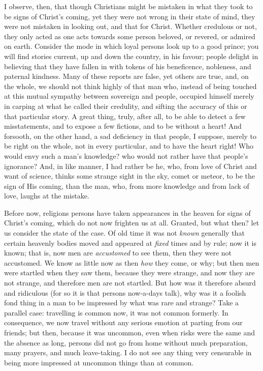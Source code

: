 I observe, then, that though Christians might be mistaken in what
they took to be signs of Christ's coming, yet they were not wrong in
their state of mind, they were not mistaken in looking out, and that
for Christ. Whether credulous or not, they only acted as one acts
towards some person beloved, or revered, or admired on earth. Consider
the mode in which loyal persons look up to a good prince; you will
find stories current, up and down the country, in his favour; people
delight in believing that they have fallen in with tokens of his
beneficence, nobleness, and paternal kindness. Many of these reports
are false, yet others are true, and, on the whole, we should not think
highly of that man who, instead of being touched at this mutual
sympathy between sovereign and people, occupied himself merely in
carping at what he called their credulity, and sifting the accuracy of
this or that particular story. A great thing, truly, after all, to be
able to detect a few misstatements, and to expose a few fictions, and
to be without a heart! And forsooth, on the other hand, a sad
deficiency in that people, I suppose, merely to be right on the whole,
not in every particular, and to have the heart right! Who would envy
such a man's knowledge? who would not rather have that people's
ignorance? And, in like manner, I had rather be he, who, from love of
Christ and want of science, thinks some strange sight in the sky,
comet or meteor, to be the sign of His coming, than the man, who, from
more knowledge and from lack of love, laughs at the mistake.

Before now, religions persons have taken appearances in the heaven
for signs of Christ's coming, which do not now frighten us at all.
Granted, but what then? let us consider the state of the case. Of old
time it was not \emph{known} generally that certain heavenly bodies
moved and appeared at \emph{fixed} times and by rule; now it is known;
that is, now men are \emph{accustomed} to see them, then they were not
accustomed. We know as little now as then \emph{how} they come, or
why; but then men were startled when they saw them, because they were
strange, and now they are not strange, and therefore men are not
startled. But how was it therefore absurd and ridiculous (for so it is
that persons now-a-days talk), why was it a foolish fond thing in a
man to be impressed by what was rare and strange? Take a parallel
case: travelling is common now, it was not common formerly. In
consequence, we now travel without any serious emotion at parting from
our friends; but then, because it was uncommon, even when risks were
the same and the absence as long, persons did not go from home without
much preparation, many prayers, and much leave-taking. I do not see
any thing very censurable in being more impressed at uncommon things
than at common.

